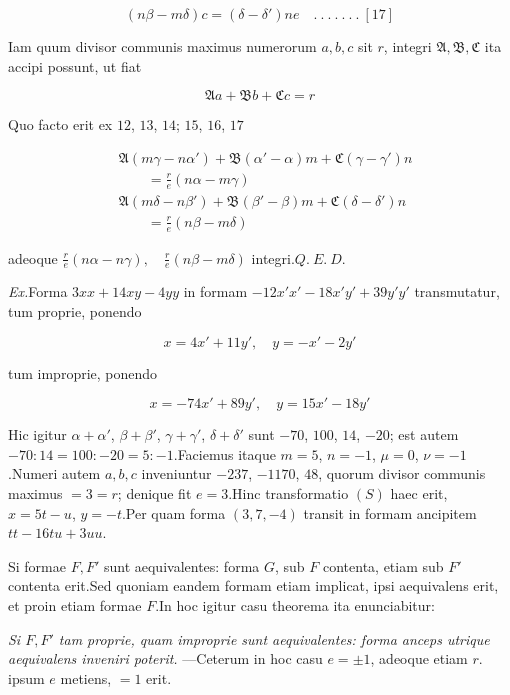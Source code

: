 \[
(n\beta-m\delta)c=(\delta-\delta')ne\quad .\ .\ .\ .\ .\ .\ .\ [17]
\]

Iam quum divisor communis maximus numerorum $a,b,c$ sit $r$, integri $\mathfrak{A},\mathfrak{B},\mathfrak{C}$ ita accipi possunt, ut fiat

\[
\mathfrak{A}a+\mathfrak{B}b+\mathfrak{C}c=r
\]

Quo facto erit ex $12$, $13$, $14$; $15$, $16$, $17$

\[
\begin{aligned}&\mathfrak A(m\gamma-n\alpha')+\mathfrak B(\alpha'-\alpha)m+\mathfrak C(\gamma-\gamma')n\\&\qquad=\frac re(n\alpha-m\gamma)\\&\mathfrak A(m\delta-n\beta')+\mathfrak B(\beta'-\beta)m+\mathfrak C(\delta-\delta')n\\&\qquad=\frac re(n\beta-m\delta)\end{aligned}
\]

adeoque $\frac{r}{e}(n\alpha-n\gamma),\quad\frac{r}{e}(n\beta-m\delta)$ integri.\quad $Q.\ E.\ D.$



\emph{Ex.}\quad Forma $3xx+14xy-4yy$ in formam $-12x'x'-18x'y'+39y'y'$ transmutatur, tum proprie, ponendo

\[
x=4x'+11y',\quad y=-x'-2y'
\]

tum improprie, ponendo

\[
x=-74x'+89y',\quad y=15x'-18y'
\]

Hic igitur $\alpha+\alpha'$, $\beta+\beta'$, $\gamma+\gamma'$, $\delta+\delta'$ sunt $-70$, $100$, $14$, $-20$; est autem $-70:14=100:-20=5:-1$.\quad Faciemus itaque $m=5$, $n=-1$, $\mu=0$, $\nu=-1$.\quad Numeri autem $a,b,c$ inveniuntur $-237$, $-1170$, $48$, quorum divisor communis maximus $=3=r$; denique fit $e=3$.\quad Hinc transformatio $(S)$ haec erit, $x=5t-u$, $y=-t$.\quad Per quam forma $(3,7,-4)$ transit in formam ancipitem $tt-16tu+3uu$.

Si formae $F,F'$ sunt aequivalentes: forma $G$, sub $F$ contenta, etiam sub $F'$ contenta erit.\quad Sed quoniam eandem formam etiam implicat, ipsi aequivalens erit, et proin etiam formae $F$.\quad In hoc igitur casu theorema ita enunciabitur:

\emph{Si $F,F'$ tam proprie, quam improprie sunt aequivalentes: forma anceps utrique aequivalens inveniri poterit.} ---\quad Ceterum in hoc casu $e=\pm1$, adeoque etiam $r.$ ipsum $e$ metiens, $=1$ erit.

